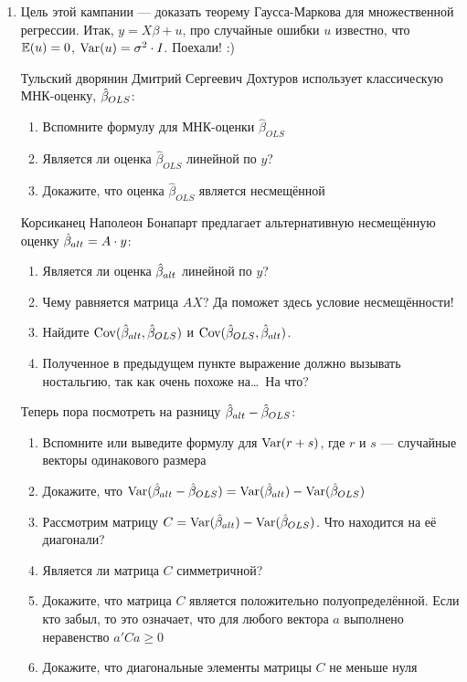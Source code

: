 \documentclass[12pt, a4paper]{article}
\begin{document}
\begin{enumerate}

\item Цель этой кампании — доказать теорему Гаусса-Маркова для множественной регрессии. Итак, $y=X\beta + u$, про случайные ошибки $u$ известно, что $\mathbb{E}(u)=0$, $\operatorname{Var}(u)=\sigma^2 \cdot I$. Поехали! :)

Тульский дворянин Дмитрий Сергеевич Дохтуров использует классическую МНК-оценку, $\hat{\beta}_{OLS}$:

\begin{enumerate}
\item Вспомните формулу для МНК-оценки $\hat \beta_{OLS}$
\item Является ли оценка $\hat \beta_{OLS}$ линейной по $y$?
\item Докажите, что оценка $\hat \beta_{OLS}$ является несмещённой
\end{enumerate}

Корсиканец Наполеон Бонапарт предлагает альтернативную несмещённую оценку $\hat{\beta}_{alt} = A\cdot y$:

\begin{enumerate}[resume]
\item Является ли оценка $\hat{\beta}_{alt}$ линейной по $y$?
\item Чему равняется матрица $AX$? Да поможет здесь условие несмещённости!
\item Найдите $\operatorname{Cov}(\hat{\beta}_{alt}, \hat{\beta}_{OLS})$ и $\operatorname{Cov}(\hat{\beta}_{OLS}, \hat{\beta}_{alt})$.
\item Полученное в предыдущем пункте выражение должно вызывать ностальгию, так как очень похоже на\ldots~На что?
\end{enumerate}

Теперь пора посмотреть на разницу $\hat{\beta}_{alt} - \hat{\beta}_{OLS}$:

\begin{enumerate}[resume]
\item Вспомните или выведите формулу для $\operatorname{Var}(r + s)$, где $r$ и $s$ — случайные векторы одинакового размера
\item Докажите, что $\operatorname{Var}(\hat{\beta}_{alt} - \hat{\beta}_{OLS}) = \operatorname{Var}(\hat{\beta}_{alt}) - \operatorname{Var}(\hat{\beta}_{OLS})$
\item Рассмотрим матрицу $C = \operatorname{Var}(\hat{\beta}_{alt}) - \operatorname{Var}(\hat{\beta}_{OLS})$. Что находится на её диагонали?
\item Является ли матрица $C$ симметричной?
\item Докажите, что матрица $C$ является положительно полуопределённой. Если кто забыл, то это означает, что для любого вектора $a$ выполнено неравенство $a'Ca \geq 0$
\item Докажите, что диагональные элементы матрицы $C$ не меньше нуля
\end{enumerate}



\end{enumerate}
\end{document}
